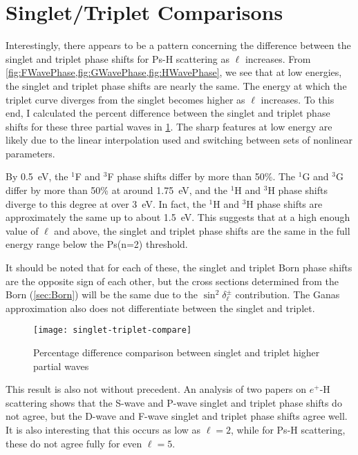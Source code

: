 \documentclass[Dissertation.tex]{subfiles}
\begin{document}
\section{Singlet/Triplet Comparisons}
\label{sec:SingTripCompare}

Interestingly, there appears to be a pattern concerning the difference between
the singlet and triplet phase shifts for Ps-H scattering as $\ell$ increases.
From \cref{fig:FWavePhase,fig:GWavePhase,fig:HWavePhase}, we see that at low
energies, the singlet and triplet phase shifts are nearly the same. The energy
at which the triplet curve diverges from the singlet becomes higher as $\ell$
increases. To this end, I calculated the percent difference between the singlet
and triplet phase shifts for these three partial waves in
\cref{fig:singlet-triplet-compare}. The sharp features at low energy are likely
due to the linear interpolation used and switching between sets of nonlinear 
parameters.

By \SI{0.5}{eV}, the $^1$F and $^3$F phase shifts differ by more than 50\%. The
$^1$G and $^3$G differ by more than 50\% at around \SI{1.75}{eV}, and the $^1$H
and $^3$H phase shifts diverge to this degree at over \SI{3}{eV}. In fact, the
$^1$H and $^3$H phase shifts are approximately the same up to about \SI{1.5}{eV}.
This suggests that at a high enough value of $\ell$ and above, the singlet and
triplet phase shifts are the same in the full energy range below the Ps(n=2)
threshold.

It should be noted that for each of these, the singlet and triplet
Born phase shifts are the opposite sign of each other, but the cross sections
determined from the Born (\cref{sec:Born}) will be the same due to the
$\sin^2 \! \delta_\ell^\pm$ contribution. The Ganas approximation also does
not differentiate between the singlet and triplet.

\begin{figure}
	\centering
	\texttt{[image: singlet-triplet-compare]}
	\caption[Singlet and triplet higher partial wave comparisons]{Percentage difference comparison between singlet and triplet higher partial waves}
	\label{fig:singlet-triplet-compare}
\end{figure}

This result is also not without precedent. An analysis of two papers on
$e^+$-H scattering \cite{Shertzer1994,Chen1997} shows that the S-wave and
P-wave singlet and triplet phase shifts do not agree, but the D-wave and
F-wave singlet and triplet phase shifts agree well. It is also interesting
that this occurs as low as $\ell = 2$, while for Ps-H scattering, these do
not agree fully for even $\ell = 5$.


\biblio
\end{document}
